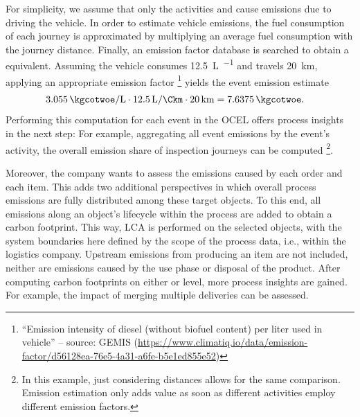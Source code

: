For simplicity, we assume that only the activities  and  cause emissions due to driving the vehicle.
In order to estimate vehicle emissions, the fuel consumption of each journey is approximated by multiplying an average fuel consumption with the journey distance.
Finally, an emission factor database is searched to obtain a \COtwo{} equivalent.
Assuming the vehicle consumes \qty{12.5}{\liter\per\Ckm} and travels \qty{20}{\km}, applying an appropriate emission factor
\footnote{
	``Emission intensity of diesel (without biofuel content) per liter used in vehicle''
  -- source: GEMIS
  (\url{https://www.climatiq.io/data/emission-factor/d56128ea-76e5-4a31-a6fe-b5e1ed855e52})
}
yields the event emission estimate
\begin{align*}
	\qty{3.055}{\kgcotwoe\per\liter} \cdot \qty{12.5}{\liter\per\Ckm} \cdot \qty{20}{\km} &= \qty{7.6375}{\kgcotwoe}.
\end{align*}
Performing this computation for each event in the OCEL offers process insights in the next step:
For example, aggregating all event emissions by the event's activity, the overall emission share of inspection journeys can be computed
\footnote{In this example, just considering distances allows for the same comparison.
Emission estimation only adds value as soon as different activities employ different emission factors.}.

Moreover, the company wants to assess the emissions caused by each order and each item.
This adds two additional perspectives in which overall process emissions are fully distributed among these target objects.
To this end, all emissions along an object's lifecycle within the process are added to obtain a carbon footprint.
This way, LCA is performed on the selected objects, with the system boundaries here defined by the scope of the process data, i.e., within the logistics company.
Upstream emissions from producing an item are not included, neither are emissions caused by the use phase or disposal of the product.
After computing carbon footprints on either  or  level,
more process insights are gained.
For example, the impact of merging multiple deliveries can be assessed.

